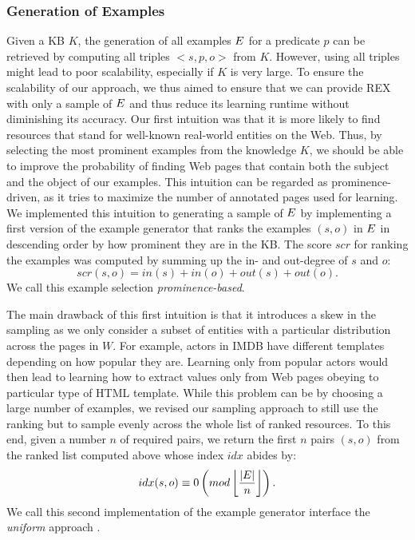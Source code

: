 \subsubsection{Generation of Examples}
Given a  \ac{KB} $K$, the generation of all examples $\mbox{\ensuremath{E}}$ for a predicate $p$ can be retrieved by computing all triples $<s,p,o>$ from $K$.
However, using all triples might lead to poor scalability, especially if $K$ is very large.
To ensure the scalability of our approach, we thus aimed to ensure that we can provide REX with only a sample of $\mbox{\ensuremath{E}}$ and thus reduce its learning runtime without diminishing its accuracy.  
Our first intuition was that it is more likely to find resources that stand for well-known real-world entities on the Web. 
Thus, by selecting the most prominent examples from the knowledge $K$, we should be able to improve the probability of finding Web pages that contain both the subject and the object of our examples. 
This intuition can be regarded as prominence-driven, as it tries to maximize the number of annotated pages used for learning. 
We implemented this intuition to generating a sample of $\mbox{\ensuremath{E}}$ by implementing a first version of the example generator that ranks the examples $(s, o)$ in $\mbox{\ensuremath{E}}$ in descending order by how prominent they are in the  \ac{KB}. The score $scr$ for ranking the examples was computed by summing up the in- and out-degree of $s$ and $o$:
\begin{equation}
scr(s, o) = in(s) + in(o) + out(s) + out(o).
\end{equation}
We call this example selection \emph{prominence-based}.

The main drawback of this first intuition is that it introduces a skew in the sampling as we only consider a subset of entities with a particular distribution across the pages in $W$. 
For example, actors in IMDB have different templates depending on how popular they are. 
Learning only from popular actors would then lead to learning how to extract values only from Web pages obeying to particular type of HTML template. 
While this problem can be by choosing a large number of examples, we revised our sampling approach to still use the ranking but to sample evenly across the whole list of ranked resources. 
To this end, given a number $n$ of required pairs, we return the first $n$ pairs $(s,o)$ from the ranked list computed above whose index $idx$ abides by:
\begin{equation}
idx(s, o) \equiv 0  \left(mod\left \lfloor{\frac{|\mbox{\ensuremath{E}}|}{n}}\right \rfloor \right).
\end{equation}
We call this second implementation of the example generator interface the \emph{uniform} approach .

